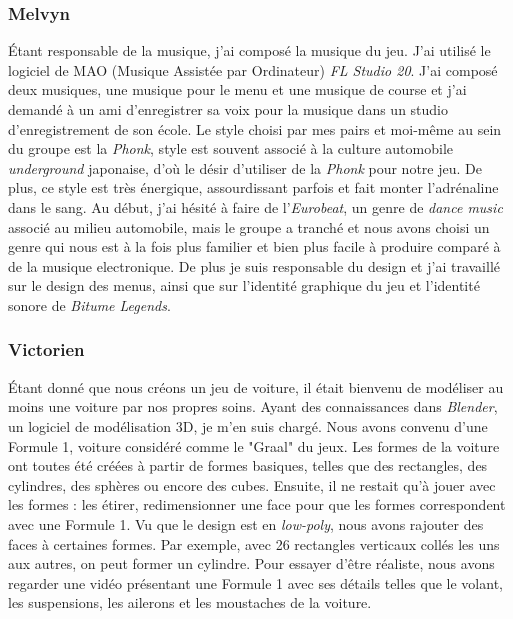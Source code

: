 \documentclass[12pt,a4paper]{article}
\newcommand{\btmlgs}{\textsl{Bitume Legends}}
\begin{document}
\clearpage

    \subsubsection{Melvyn}
        Étant responsable de la musique, j'ai composé la 
        musique du jeu. J'ai utilisé le logiciel de MAO (Musique Assistée par Ordinateur) 
        \textsl{FL Studio 20}. J'ai composé deux musiques, une musique pour le menu et 
        une musique de course et j'ai demandé à un ami d'enregistrer sa voix pour la musique
        dans un studio d'enregistrement de son école. Le style choisi par mes pairs et moi-même
        au sein du groupe est la \textsl{Phonk}, style est souvent associé à la culture automobile
        \textit{underground} japonaise, d'où le désir d'utiliser de la \textsl{Phonk} pour notre jeu. 
        De plus, ce style est très énergique, assourdissant parfois et fait monter l'adrénaline
        dans le sang. Au début, j'ai hésité à faire de l'\textit{Eurobeat}, un genre de \textit{dance music}
        associé au milieu automobile, mais le groupe a tranché et nous avons choisi un genre qui
        nous est à la fois plus familier et bien plus facile à produire comparé à de la musique
        electronique. De plus je suis responsable du design et j'ai travaillé sur le design des
        menus, ainsi que sur l'identité graphique du jeu et l'identité sonore de \btmlgs.

    \subsubsection{Victorien}
        Étant donné que nous créons un jeu de voiture, il était 
        bienvenu de modéliser au moins une voiture par nos propres soins. 
        Ayant des connaissances dans \textsl{Blender}, un logiciel 
        de modélisation 3D, je m'en suis chargé. 
        Nous avons convenu d'une Formule 1, voiture considéré comme le "Graal" du jeux. 
        Les formes de la voiture ont toutes été créées à partir de formes basiques,
        telles que des rectangles, des cylindres, des sphères ou encore des cubes. 
        Ensuite, il ne restait qu'à jouer avec les formes : les étirer, 
        redimensionner une face pour que les formes correspondent avec une Formule 1. 
        Vu que le design est en \textit{low-poly}, nous avons rajouter des
        faces à certaines formes. Par exemple, avec 26 rectangles verticaux collés les 
        uns aux autres, on peut former un cylindre.
        Pour essayer d'être réaliste, nous avons regarder une 
        vidéo présentant une Formule 1 avec ses détails telles que le volant, 
        les suspensions, les ailerons et les moustaches de la voiture.
\end{document}
